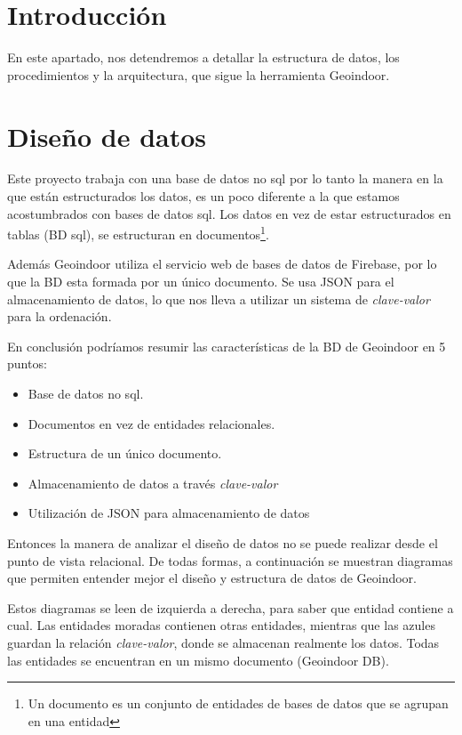 
\section{Introducción}
En este apartado, nos detendremos a detallar la estructura de datos, los procedimientos y la arquitectura, que sigue la herramienta Geoindoor.
\section{Diseño de datos}

Este proyecto trabaja con una base de datos no sql por lo tanto la manera en la que están estructurados los datos, es un poco diferente a la que estamos acostumbrados con bases de datos sql.
Los datos en vez de estar estructurados en tablas (BD sql), se estructuran en documentos\footnote{Un documento es un conjunto de entidades de bases de datos que se agrupan en una entidad}. 

Además Geoindoor utiliza el servicio web de bases de datos de Firebase, por lo que la BD esta formada por un único documento. Se usa JSON para el almacenamiento de datos, lo que nos lleva a utilizar un sistema de \textit{clave-valor} para la ordenación.

En conclusión podríamos resumir las características de la BD de Geoindoor en 5 puntos:

\begin{itemize}
	\item Base de datos no sql.
	\item Documentos en vez de entidades relacionales.
	\item Estructura de un único documento.
	\item Almacenamiento de datos a través \textit{clave-valor}
	\item Utilización de JSON para almacenamiento de datos
\end{itemize} 

Entonces la manera de analizar el diseño de datos no se puede realizar desde el punto de vista relacional. De todas formas, a continuación se muestran diagramas que permiten entender mejor el diseño y estructura de datos de Geoindoor.


Estos diagramas se leen de izquierda a derecha, para saber que entidad contiene a cual. Las entidades moradas contienen otras entidades, mientras que las azules guardan la relación \textit{clave-valor}, donde se almacenan realmente los datos. Todas las entidades se encuentran en un mismo documento (Geoindoor DB).

